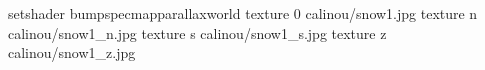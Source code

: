 setshader bumpspecmapparallaxworld
texture 0 calinou/snow1.jpg
texture n calinou/snow1_n.jpg
texture s calinou/snow1_s.jpg
texture z calinou/snow1_z.jpg
